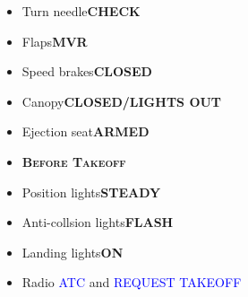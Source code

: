 \documentclass[a4paper,12pt,dvipsnames]{letter}
\newcommand{\radio}[1]{\textcolor{blue}{#1}}
\newcommand{\button}[1]{\textbf{#1}}
\newcommand{\myHead}[1]{{\LARGE\textsc{\textbf{#1}}}}
\begin{document}
{\begin{itemize}
 \item Turn needle\dotfill\button{CHECK}
 \item Flaps\dotfill\button{MVR}
 \item Speed brakes\dotfill\button{CLOSED}
 \item Canopy\dotfill\button{CLOSED/LIGHTS OUT}
 \item Ejection seat\dotfill\button{ARMED}
\end{itemize}
\begin{itemize}
 \item[] \myHead{Before Takeoff}
 \item Position lights\dotfill\button{STEADY}
 \item Anti-collsion lights\dotfill\button{FLASH}
 \item Landing lights\dotfill\button{ON}
 \item Radio \radio{ATC} and \radio{REQUEST TAKEOFF}
\end{itemize}
}
\end{document}
